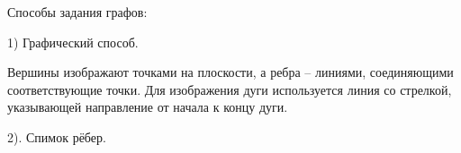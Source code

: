                                                                                                                                                                                                                                                                                                                                                                                                                                                                                                                                                                                                                                                                                                                                                                                                                                                                                                                                                                                                                                                                                                                                                                                                                                                                                                                                                                                                                                                                                                                                                                                                                                                                                                                                                                                                                                                                                                                                                                                                                                                                                                                                                                                                                                                                \zagolovok{}
Способы задания графов:

1) Графический способ.

Вершины изображают точками на плоскости, а ребра – линиями, соединяющими соответствующие точки. Для изображения дуги используется линия со стрелкой, указывающей направление от начала к концу дуги.

2). Спимок рёбер.

